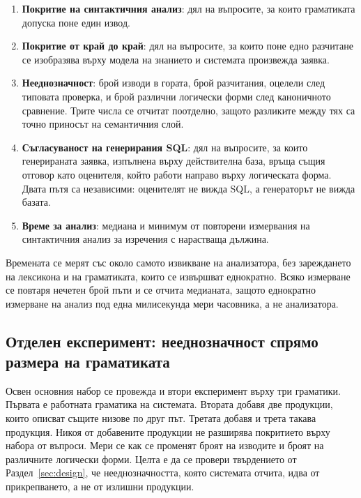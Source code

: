 \begin{enumerate}[topsep=0pt,itemsep=0pt,leftmargin=*]
\item \textbf{Покритие на синтактичния анализ}: дял на въпросите, за които граматиката
      допуска поне един извод.
\item \textbf{Покритие от край до край}: дял на въпросите, за които поне едно разчитане
      се изобразява върху модела на знанието и системата произвежда заявка.
\item \textbf{Нееднозначност}: брой изводи в гората, брой разчитания, оцелели след
      типовата проверка, и брой различни логически форми след каноничното сравнение.
      Трите числа се отчитат поотделно, защото разликите между тях са точно приносът на
      семантичния слой.
\item \textbf{Съгласуваност на генерирания SQL}: дял на въпросите, за които генерираната
      заявка, изпълнена върху действителна база, връща същия отговор като оценителя,
      който работи направо върху логическата форма. Двата пътя са независими:
      оценителят не вижда SQL, а генераторът не вижда базата.
\item \textbf{Време за анализ}: медиана и минимум от повторени измервания на
      синтактичния анализ за изречения с нарастваща дължина.
\end{enumerate}

Времената се мерят със  около самото извикване на
анализатора, без зареждането на лексикона и на граматиката, които се извършват еднократно.
Всяко измерване се повтаря нечетен брой пъти и се отчита медианата, защото еднократно
измерване на анализ под една милисекунда мери часовника, а не анализатора.

\subsection{Отделен експеримент: нееднозначност спрямо размера на граматиката}

Освен основния набор се провежда и втори експеримент върху три граматики. Първата е
работната граматика на системата. Втората добавя две продукции, които описват същите
низове по друг път. Третата добавя и трета такава продукция. Никоя от добавените
продукции не разширява покритието върху набора от въпроси. Мери се как се променят броят
на изводите и броят на различните логически форми. Целта е да се провери твърдението от
Раздел~\ref{sec:design}, че нееднозначността, която системата отчита, идва от
прикрепването, а не от излишни продукции.

